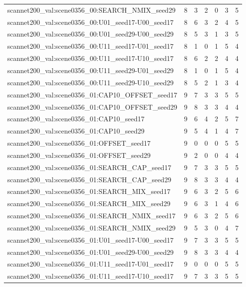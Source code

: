 \begin{table}[t]
\begin{tabular}{lrrrrrr}
scannet200\_val:scene0356\_00:SEARCH\_NMIX\_seed29 & 8 & 3 & 2 & 0 & 3 & 5 \\
scannet200\_val:scene0356\_00:U01\_seed17-U00\_seed17 & 8 & 6 & 3 & 2 & 4 & 5 \\
scannet200\_val:scene0356\_00:U01\_seed29-U00\_seed29 & 8 & 5 & 3 & 1 & 3 & 5 \\
scannet200\_val:scene0356\_00:U11\_seed17-U01\_seed17 & 8 & 1 & 0 & 1 & 5 & 4 \\
scannet200\_val:scene0356\_00:U11\_seed17-U10\_seed17 & 8 & 6 & 2 & 2 & 4 & 4 \\
scannet200\_val:scene0356\_00:U11\_seed29-U01\_seed29 & 8 & 1 & 0 & 1 & 5 & 4 \\
scannet200\_val:scene0356\_00:U11\_seed29-U10\_seed29 & 8 & 5 & 2 & 1 & 3 & 4 \\
scannet200\_val:scene0356\_01:CAP10\_OFFSET\_seed17 & 9 & 7 & 3 & 3 & 5 & 5 \\
scannet200\_val:scene0356\_01:CAP10\_OFFSET\_seed29 & 9 & 8 & 3 & 3 & 4 & 4 \\
scannet200\_val:scene0356\_01:CAP10\_seed17 & 9 & 6 & 4 & 2 & 5 & 7 \\
scannet200\_val:scene0356\_01:CAP10\_seed29 & 9 & 5 & 4 & 1 & 4 & 7 \\
scannet200\_val:scene0356\_01:OFFSET\_seed17 & 9 & 0 & 0 & 0 & 5 & 5 \\
scannet200\_val:scene0356\_01:OFFSET\_seed29 & 9 & 2 & 0 & 0 & 4 & 4 \\
scannet200\_val:scene0356\_01:SEARCH\_CAP\_seed17 & 9 & 7 & 3 & 3 & 5 & 5 \\
scannet200\_val:scene0356\_01:SEARCH\_CAP\_seed29 & 9 & 8 & 3 & 3 & 4 & 4 \\
scannet200\_val:scene0356\_01:SEARCH\_MIX\_seed17 & 9 & 6 & 3 & 2 & 5 & 6 \\
scannet200\_val:scene0356\_01:SEARCH\_MIX\_seed29 & 9 & 6 & 3 & 1 & 4 & 6 \\
scannet200\_val:scene0356\_01:SEARCH\_NMIX\_seed17 & 9 & 6 & 3 & 2 & 5 & 6 \\
scannet200\_val:scene0356\_01:SEARCH\_NMIX\_seed29 & 9 & 5 & 3 & 0 & 4 & 7 \\
scannet200\_val:scene0356\_01:U01\_seed17-U00\_seed17 & 9 & 7 & 3 & 3 & 5 & 5 \\
scannet200\_val:scene0356\_01:U01\_seed29-U00\_seed29 & 9 & 8 & 3 & 3 & 4 & 4 \\
scannet200\_val:scene0356\_01:U11\_seed17-U01\_seed17 & 9 & 0 & 0 & 0 & 5 & 5 \\
scannet200\_val:scene0356\_01:U11\_seed17-U10\_seed17 & 9 & 7 & 3 & 3 & 5 & 5 \\

\end{tabular}
\end{table}
